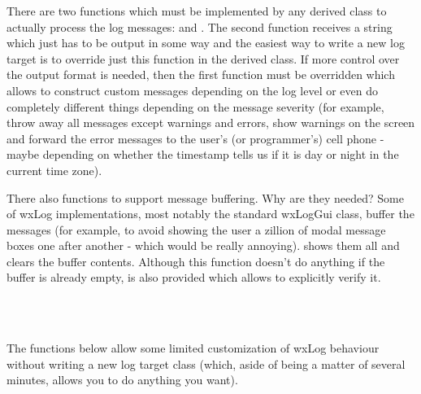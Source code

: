 \\
\\
\\
\\
\\


There are two functions which must be implemented by any derived class to
actually process the log messages:  and 
. The second function receives a string
which just has to be output in some way and the easiest way to write a new log
target is to override just this function in the derived class. If more control
over the output format is needed, then the first function must be overridden
which allows to construct custom messages depending on the log level or even
do completely different things depending on the message severity (for example,
throw away all messages except warnings and errors, show warnings on the
screen and forward the error messages to the user's (or programmer's) cell
phone - maybe depending on whether the timestamp tells us if it is day or
night in the current time zone).

There also functions to support message buffering. Why are they needed?
Some of wxLog implementations, most notably the standard wxLogGui class,
buffer the messages (for example, to avoid showing the user a zillion of modal
message boxes one after another - which would be really annoying). 
 shows them all and clears the buffer contents.
Although this function doesn't do anything if the buffer is already empty,
 is also provided which
allows to explicitly verify it.

\\
\\

\label{wxlogcustomization}

The functions below allow some limited customization of wxLog behaviour
without writing a new log target class (which, aside of being a matter of
several minutes, allows you to do anything you want).

